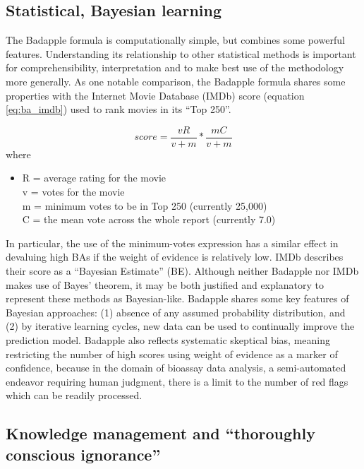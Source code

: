 \subsection{Statistical, Bayesian learning}

The Badapple formula is computationally simple, but combines some powerful features. Understanding its relationship to other statistical methods is important for comprehensibility, interpretation and to make best use of the methodology more generally. As one notable comparison, the Badapple formula shares some properties with the Internet Movie Database (IMDb) score (equation \ref{eq:ba_imdb}) used to rank movies in its “Top 250”\cite{IMDb_undated-ci}.

\begin{equation}
score = \frac{vR}{v + m} * \frac{mC}{v + m}
\label{eq:ba_imdb}
\end{equation}
where
\begin{itemize}
\item[] R = average rating for the movie\\
v = votes for the movie\\
m = minimum votes to be in Top 250 (currently 25,000)\\
C = the mean vote across the whole report (currently 7.0)\\
\end{itemize}

In particular, the use of the minimum-votes expression has a similar effect in devaluing high BAs if the weight of evidence is relatively low. IMDb describes their score as a “Bayesian Estimate” (BE). Although neither Badapple nor IMDb makes use of Bayes’ theorem, it may be both justified and explanatory to represent these methods as Bayesian-like. Badapple shares some key features of Bayesian approaches: (1) absence of any assumed probability distribution, and (2) by iterative learning cycles, new data can be used to continually improve the prediction model. Badapple also reflects systematic skeptical bias, meaning restricting the number of high scores using weight of evidence as a marker of confidence, because in the domain of bioassay data analysis, a semi-automated endeavor requiring human judgment, there is a limit to the number of red flags which can be readily processed.

\subsection{Knowledge management and “thoroughly conscious ignorance”}

